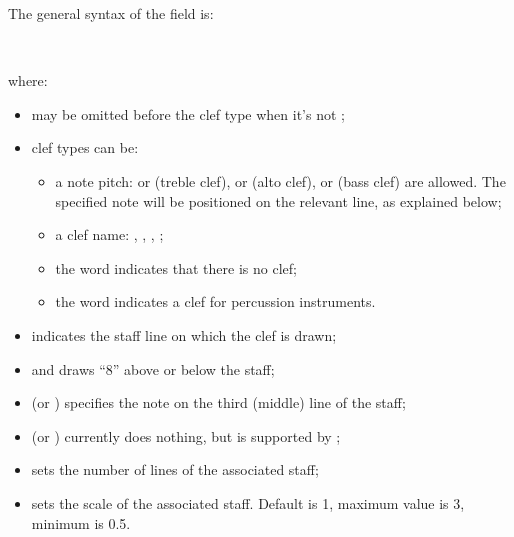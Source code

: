 \documentclass[a4paper,fullpage,12pt]{book}
\begin{document}
The general syntax of the  field is:

\medskip

   
  
 \\
 

\medskip

where:

\begin{itemize}
  
  \item {} may be omitted before the clef type when it's not
  ;
  
  \item clef types can be:
  
  \begin{itemize}
    
    \item a note pitch:  or  (treble clef),  or
     (alto clef),  or  (bass clef) are allowed.
    The specified note will be positioned on the relevant line, as
    explained below;
    
    \item a clef name: , , ,  
    ;
    
    \item the word  indicates that there is no clef;
    
    \item the word  indicates a clef for percussion 
    instruments.

  \end{itemize}

  \item {} indicates the staff line on which the clef
  is drawn;
  
  \item {} and  draws ``8'' above or below the staff;
  
  \item {} (or )
  specifies the note on the third (middle) line of the staff;
  
  \item {} (or ) currently does nothing, but
  is supported by \abcMID;
  
  \item {} sets the number of lines of the
  associated staff;
  
  \item {} sets the scale of the associated
  staff. Default is 1, maximum value is 3, minimum is 0.5.
  
\end{itemize}
\end{document}
